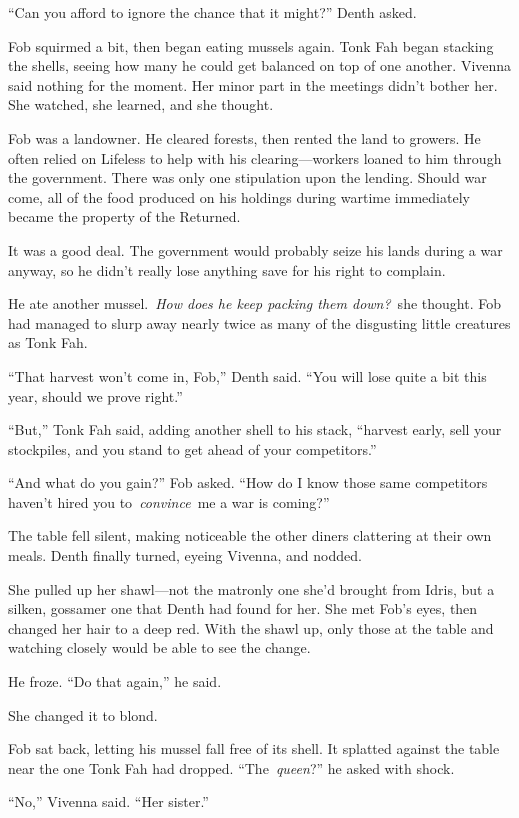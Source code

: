 “Can you afford to ignore the chance that it might?” Denth asked.

Fob squirmed a bit, then began eating mussels again. Tonk Fah began stacking the shells, seeing how many he could get balanced on top of one another. Vivenna said nothing for the moment. Her minor part in the meetings didn’t bother her. She watched, she learned, and she thought.

Fob was a landowner. He cleared forests, then rented the land to growers. He often relied on Lifeless to help with his clearing—workers loaned to him through the government. There was only one stipulation upon the lending. Should war come, all of the food produced on his holdings during wartime immediately became the property of the Returned.

It was a good deal. The government would probably seize his lands during a war anyway, so he didn’t really lose anything save for his right to complain.

He ate another mussel.~\textit{How does he keep packing them down?}~she thought. Fob had managed to slurp away nearly twice as many of the disgusting little creatures as Tonk Fah.

“That harvest won’t come in, Fob,” Denth said. “You will lose quite a bit this year, should we prove right.”

“But,” Tonk Fah said, adding another shell to his stack, “harvest early, sell your stockpiles, and you stand to get ahead of your competitors.”

“And what do you gain?” Fob asked. “How do I know those same competitors haven’t hired you to~\textit{convince}~me a war is coming?”

The table fell silent, making noticeable the other diners clattering at their own meals. Denth finally turned, eyeing Vivenna, and nodded.

She pulled up her shawl—not the matronly one she’d brought from Idris, but a silken, gossamer one that Denth had found for her. She met Fob’s eyes, then changed her hair to a deep red. With the shawl up, only those at the table and watching closely would be able to see the change.

He froze. “Do that again,” he said.

She changed it to blond.

Fob sat back, letting his mussel fall free of its shell. It splatted against the table near the one Tonk Fah had dropped. “The~\textit{queen}?” he asked with shock.

“No,” Vivenna said. “Her sister.”

